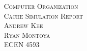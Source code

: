 \begin{titlepage}
\begin{center} 
\vspace*{2cm}
\textsc{\huge Computer Organization}\\[1cm]
\textsc{\LARGE Cache Simulation Report}\\[13cm]

\textsc{\large Andrew Kee}\\[0.25cm]
\textsc{\large Ryan Montoya} \\[0.25cm]
\textsc{ECEN 4593}

\end{center}
\end{titlepage}